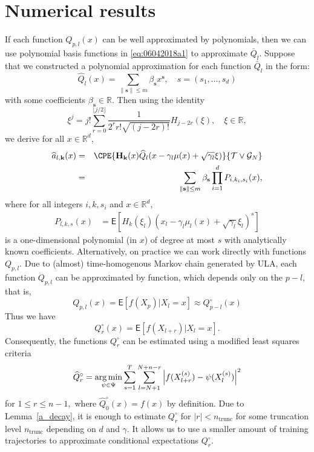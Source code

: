 \documentclass[preprint]{imsart}
\def\rset{\mathbb{R}}
\def\TrainSet{\mathcal{T}}
\newcommand*{\argmin}{\operatornamewithlimits{arg\,min}}
\begin{document}
\section{Numerical results}
\label{sec:num}
If each function  \(Q_{p,l}(x) \) can be well approximated by polynomials, then we can use polynomial basis functions in   \eqref{eq:06042018a1} to approximate \(\bar Q_l\). Suppose that we constructed a polynomial approximation  for each function \(\bar Q_{l}\)  in the form:
\begin{equation*}
\widehat{Q}_{l}(x) = \sum_{\|\mathbf{s}\|\leq m} \beta_{\mathbf{s}} x^{\mathbf{s}},\quad s=(s_1,\ldots,s_d)
\end{equation*}
with some coefficients \(\beta_{\mathbf{s}}\in \mathbb{R}.\)
Then using the identity
\[
\xi^j = j! \sum_{r = 0}^{\lfloor j/2 \rfloor} \frac{1}{2^r  r! \sqrt{(j-2r)!}} H_{j-2r}(\xi),\quad \xi \in \mathbb{R},
\]
we derive for all $x \in \mathbb{R}^d$, 
\begin{eqnarray*}
\widehat a_{l,\mathbf{k}} (x) &=&\CPE{\mathbf{H}_\mathbf{k}(x) \widehat{Q}_{l}(x - \gamma_l \mu(x) + \sqrt{\gamma_l}\xi)}{\TrainSet \vee \mathcal{G}_N} 
\\
&=& \sum_{\|\mathbf{s}\|\leq m} \beta_{\mathbf{s}} \prod_{i=1}^d P_{i,k_i,s_i}(x),
\end{eqnarray*}
where for all integers $i,k,s_i$ and $x \in \rset^d$,
\begin{align*}
P_{l,k,s}(x) &= \mathsf{E} \left[ H_{k}(\xi_l) (x_l - \gamma_l \mu_l(x) + \sqrt{\gamma_l} \xi_l)^{s} \right]
\end{align*}
is a one-dimensional polynomial (in \(x\)) of degree at most \(s\) with analytically known coefficients. Alternatively, on practice we can work directly with functions \(Q_{p,l}.\) Due to (almost) time-homogenous Markov chain generated by ULA, each function $Q_{p,l}$ can be approximated by function, which depends only on the  $p-l$, that is,
\[
 Q_{p,l}(x) = \mathsf{E} \left[f(X_p) | X_l = x\right] \approx Q^\circ_{p-l}(x) 
 \]
Thus we have
\[ 
  Q^\circ_{r}(x) = \mathsf{E} \left[f(X_{l+r}) | X_l = x \right].
 \]
Consequently, the functions $Q^\circ_r$ can be estimated using a modified least squares criteria
\begin{eqnarray}
\label{eq:Qcircr}
\widehat{Q}^\circ_r = \argmin_{\psi \in \Psi} \sum_{s = 1}^{T} \sum_{l = N + 1}^{N+n-r} \left| f(X_{l+r}^{(s)}) - \psi(X_l^{(s)})\right|^2 
\end{eqnarray}
for \(1 \leq r \leq n-1,\) where  $\widehat{Q}^\circ_0(x) = f(x)$ by definition.
Due to Lemma~\ref{a_decay}, it is enough to estimate $Q^\circ_{r}$ for $|r| < n_{\mathrm{trunc}}$ for some truncation level \(n_{\mathrm{trunc}}\) depending on \(d\) and \(\gamma.\) It allows us to use a smaller amount of training trajectories to approximate conditional expectations $Q^\circ_{r}$. 
\end{document}
